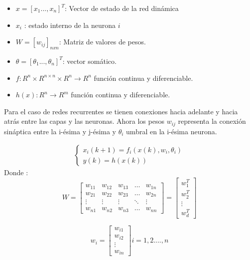 \begin{itemize}
	\item $x=[x_{1}...,x_{n}]^{T}$: Vector de estado de la red dinámica
	\item  $x_{i}$ : estado interno de la neurona $i$
	\item  $W=[w_{ij}]_{nxn}$: Matriz de valores de pesos.
	\item $\theta=[\theta_{1}...,\theta_{n}]^{T}$: vector somático.
	\item $f:R^{n}\times R^{n\times n}\times R^{n} \rightarrow R^{n}$ función continua y diferenciable.
	\item $h(x):R^{n} \rightarrow R^{m}$ función continua y diferenciable. 	
\end{itemize}



Para el caso de redes recurrentes se tienen conexiones hacia adelante y hacia atrás entre las capas y las neuronas. Ahora los pesos $w_{ij}$ representa la conexión sináptica entre la i-ésima  y j-ésima y $\theta_{i}$ umbral en la i-ésima neurona.


\begin{equation}
\label{ECUATIONs}
\begin{aligned}
\left\lbrace
\begin{array}{ll}
x_{i}(k+1)=f_{i}(x(k),w_{i},\theta_{i}) \\
y(k)= h(x(k))
\end{array}
\right.
\end{aligned}
\end{equation}
Donde :
\begin{equation}
W=		
\begin{bmatrix}
	w_{11} & w_{12} & w_{13} & \dots  & w_{1n} \\
	w_{21} & w_{22} & w_{23} & \dots  & w_{2n} \\
	\vdots & \vdots & \vdots & \ddots & \vdots \\
	w_{n1} & w_{n2} & w_{n3} & \dots  & w_{nn}
\end{bmatrix}
=
\begin{bmatrix}
w_{1}^{T} \\
w_{2}^{T} \\
\vdots \\
w_{d}^{T}
\end{bmatrix}
\end{equation}

\begin{equation}
w_{i}=		
\begin{bmatrix}
	w_{i1}  \\
	w_{i2}  \\
	\vdots  \\
	w_{in} 
\end{bmatrix}
i=1,2 ...., n
\end{equation}


